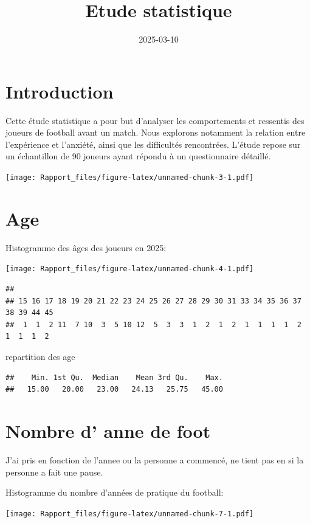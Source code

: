 \documentclass[
]{article}
\title{Etude statistique}
\author{}
\date{\vspace{-2.5em}2025-03-10}
\begin{document}
\maketitle

{
\setcounter{tocdepth}{2}
\tableofcontents
}
\section{Introduction}\label{introduction}

Cette étude statistique a pour but d'analyser les comportements et
ressentis des joueurs de football avant un match. Nous explorons
notamment la relation entre l'expérience et l'anxiété, ainsi que les
difficultés rencontrées. L'étude repose sur un échantillon de 90 joueurs
ayant répondu à un questionnaire détaillé.

\texttt{[image: Rapport\_files/figure-latex/unnamed-chunk-3-1.pdf]}

\section{Age}\label{age}

Histogramme des âges des joueurs en 2025:

\texttt{[image: Rapport\_files/figure-latex/unnamed-chunk-4-1.pdf]}

\begin{verbatim}
## 
## 15 16 17 18 19 20 21 22 23 24 25 26 27 28 29 30 31 33 34 35 36 37 38 39 44 45 
##  1  1  2 11  7 10  3  5 10 12  5  3  3  1  2  1  2  1  1  1  1  2  1  1  1  2
\end{verbatim}

repartition des age

\begin{verbatim}
##    Min. 1st Qu.  Median    Mean 3rd Qu.    Max. 
##   15.00   20.00   23.00   24.13   25.75   45.00
\end{verbatim}

\section{Nombre d' anne de foot}\label{nombre-d-anne-de-foot}

J'ai pris en fonction de l'annee ou la personne a commencé, ne tient pas
en si la personne a fait une pause.

Histogramme du nombre d'années de pratique du football:

\texttt{[image: Rapport\_files/figure-latex/unnamed-chunk-7-1.pdf]}
\end{document}
